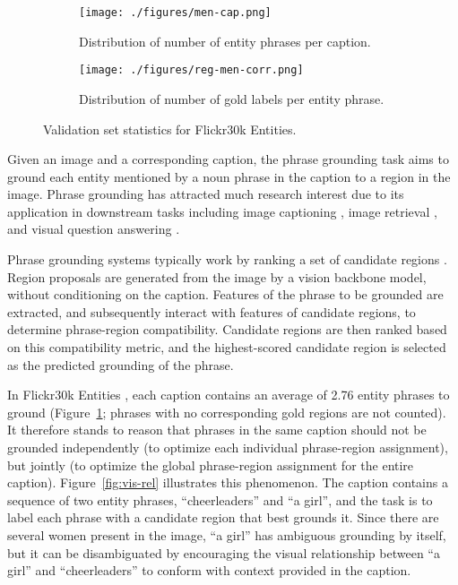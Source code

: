 \documentclass[11pt,a4paper]{article}
\begin{document}
\begin{figure}[t]
    \centering
    \begin{subfigure}[b]{0.48 \columnwidth}
        \texttt{[image: ./figures/men-cap.png]}
        \caption{Distribution of number of entity phrases per caption. }
        \label{fig:men-cap}
    \end{subfigure}
    \begin{subfigure}[b]{0.48 \columnwidth}
        \texttt{[image: ./figures/reg-men-corr.png]}
        \caption{Distribution of number of gold labels per entity phrase. }
        \label{fig:reg-men}
    \end{subfigure}
    \caption{Validation set statistics for Flickr30k Entities. }
\end{figure}

Given an image and a corresponding caption, the phrase grounding task aims to ground each entity mentioned by a noun phrase in the caption to a region in the image. Phrase grounding has attracted much research interest due to its application in downstream tasks including image captioning \cite{DBLP:conf/nips/KarpathyJL14, DBLP:conf/cvpr/FangGISDDGHMPZZ15, DBLP:journals/pami/DonahueHRVGSD17, DBLP:conf/icml/XuBKCCSZB15}, image retrieval \cite{DBLP:conf/cvpr/ChenBFWN17, DBLP:conf/eccv/RadenovicTC16}, and visual question answering \cite{DBLP:journals/ijcv/AgrawalLAMZPB17, DBLP:conf/iccv/YuY0T17, DBLP:journals/tnn/YuYXFT18}. 

Phrase grounding systems typically work by ranking a set of candidate regions \cite{DBLP:conf/iccv/ChenKN17, DBLP:conf/ijcai/YuYXZ0T18}. Region proposals are generated from the image by a vision backbone model, without conditioning on the caption. Features of the phrase to be grounded are extracted, and subsequently interact with features of candidate regions, to determine phrase-region compatibility. Candidate regions are then ranked based on this compatibility metric, and the highest-scored candidate region is selected as the predicted grounding of the phrase. 

In Flickr30k Entities \cite{DBLP:journals/ijcv/PlummerWCCHL17}, each caption contains an average of 2.76 entity phrases to ground (Figure~\ref{fig:men-cap}; phrases with no corresponding gold regions are not counted). It therefore stands to reason that phrases in the same caption should not be grounded independently (to optimize each individual phrase-region assignment), but jointly (to optimize the global phrase-region assignment for the entire caption). Figure~\ref{fig:vis-rel} illustrates this phenomenon. The caption contains a sequence of two entity phrases, ``cheerleaders'' and ``a girl'', and the task is to label each phrase with a candidate region that best grounds it. Since there are several women present in the image, ``a girl'' has ambiguous grounding by itself, but it can be disambiguated by encouraging the visual relationship between ``a girl'' and ``cheerleaders'' to conform with context provided in the caption. 
\end{document}
